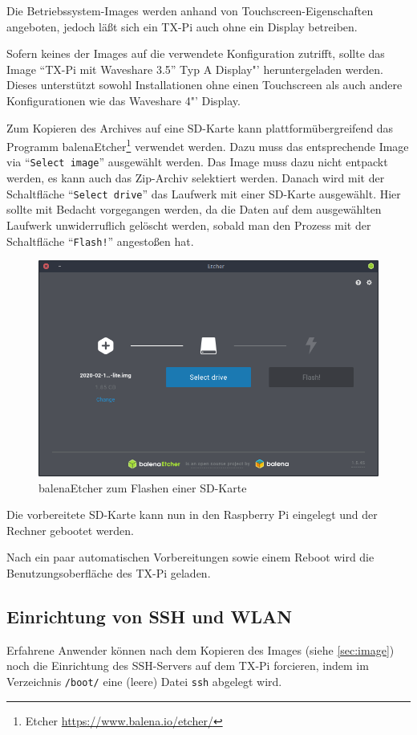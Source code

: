 \documentclass[
  paper=A4,
  ngerman,
  fontsize=12pt,
  parskip=half-,
]{scrbook}
\begin{document}
Die Betriebssystem-Images werden anhand von Touchscreen-Eigenschaften 
angeboten, jedoch läßt sich ein TX-Pi auch ohne ein Display
betreiben.

Sofern keines der Images auf die verwendete Konfiguration zutrifft, 
sollte das Image "`TX-Pi mit Waveshare 3.5"' Typ A Display"'  heruntergeladen werden. 
Dieses unterstützt sowohl Installationen ohne einen 
Touchscreen als auch andere Konfigurationen wie das Waveshare
4"' Display.

Zum Kopieren des Archives auf eine SD-Karte kann plattformübergreifend
das Programm balenaEtcher\footnote{Etcher \url{https://www.balena.io/etcher/}} verwendet werden.
Dazu muss das entsprechende Image via "`\texttt{Select image}"' ausgewählt
werden. Das Image muss dazu nicht entpackt werden, es kann auch das
Zip-Archiv selektiert werden. Danach wird mit der Schaltfläche "`\texttt{Select drive}"'
das Laufwerk mit einer SD-Karte ausgewählt. Hier sollte mit Bedacht vorgegangen
werden, da die Daten auf dem ausgewählten Laufwerk unwiderruflich gelöscht
werden, sobald man den Prozess mit der Schaltfläche "`\texttt{Flash!}"' angestoßen
hat.
\clearpage

\begin{figure}[ht]
\centering
\includegraphics[scale=0.45]{images/etcher.png}
\caption{balenaEtcher zum Flashen einer SD-Karte}
\end{figure}

Die vorbereitete SD-Karte kann nun in den Raspberry Pi eingelegt
und der Rechner gebootet werden.

Nach ein paar automatischen Vorbereitungen sowie einem Reboot wird 
die Benutzungsoberfläche des TX-Pi geladen. 

\subsection{Einrichtung von SSH und WLAN}
Erfahrene Anwender können nach dem Kopieren des Images (siehe \ref{sec:image}) noch die Einrichtung
des SSH-Servers auf dem TX-Pi forcieren, indem im Verzeichnis \texttt{/boot/}
eine (leere) Datei \texttt{ssh} abgelegt wird. 
\end{document}
